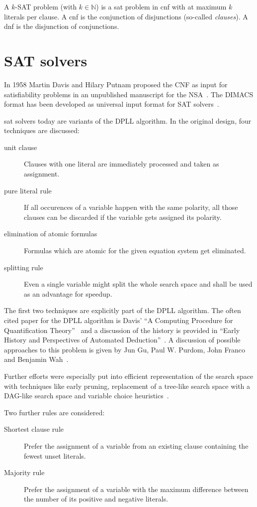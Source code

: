 A $k$-SAT problem (with $k \in \mathbb{N}$) is a \gls{sat} problem in \gls{cnf} with at maximum $k$ literals per clause. A \gls{cnf} is the conjunction of disjunctions (so-called \emph{clauses}). A \gls{dnf} is the disjunction of conjunctions.

\section{SAT solvers}
\label{sec:satsolvers}
%
In 1958 Martin Davis and Hilary Putnam proposed the CNF as input for satisfiability problems in an unpublished manuscript for the NSA~\cite{Sat20}. The DIMACS format has been developed as universal input format for SAT solvers~\cite{Sat09}.

\gls{sat} solvers today are variants of the DPLL algorithm. In the original design, four techniques are discussed:
\begin{description}
  \item[unit clause] Clauses with one literal are immediately processed and taken as assignment.
  \item[pure literal rule] If all occurences of a variable happen with the same polarity, all those clauses can be discarded if the variable gets assigned its polarity.
  \item[elimination of atomic formulas] Formulas which are atomic for the given equation system get eliminated.
  \item[splitting rule] Even a single variable might split the whole search space and shall be used as an advantage for speedup.
\end{description}
%
The first two techniques are explicitly part of the DPLL algorithm. The often cited paper for the DPLL algorithm is Davis' ``A Computing Procedure for Quantification Theory''~\cite{Sat05} and a discussion of the history is provided in ``Early History and Perspectives of Automated Deduction''~\cite{Sat06}. A discussion of possible approaches to this problem is given by Jun Gu, Paul W. Purdom, John Franco and Benjamin Wah~\cite{Sat08}.

Further efforts were especially put into efficient representation of the search space with techniques like early pruning, replacement of a tree-like search space with a DAG-like search space and variable choice heuristics~\cite[24]{Sat20}.

Two further rules are considered:
\begin{description}
  \item[Shortest clause rule]
    Prefer the assignment of a variable from an existing clause containing the fewest unset literals.
  \item[Majority rule]
    Prefer the assignment of a variable with the maximum difference between the number of its positive and negative literals.
\end{description}

